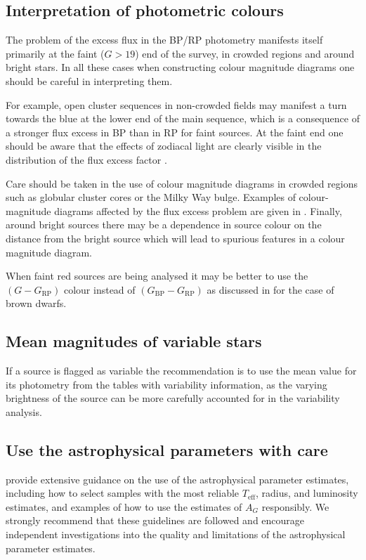 \documentclass[longauth]{aa_gaia} %
\newcommand\gbp{\ensuremath{G_\mathrm{BP}}}
\newcommand\grp{\ensuremath{G_\mathrm{RP}}}
\newcommand\teff{\ensuremath{T_\mathrm{eff}}}
\newcommand\ag{\ensuremath{A_G}}
\begin{document}
\subsection{Interpretation of photometric colours}

The problem of the excess flux in the BP/RP photometry manifests itself primarily at the faint
($G>19$) end of the survey, in crowded regions and around bright stars. In all these cases when
constructing colour magnitude diagrams one should be careful in interpreting them.

For example, open cluster sequences in non-crowded fields may manifest a turn towards the blue at
the lower end of the main sequence, which is a consequence of a stronger flux excess in BP than in
RP for faint sources. At the faint end one should be aware that the effects of zodiacal light are
clearly visible in the distribution of the flux excess factor \citep{DR2-DPACP-40}.

Care should be taken in the use of colour magnitude diagrams in crowded regions such as globular
cluster cores or the Milky Way bulge. Examples of colour-magnitude diagrams affected by the flux
excess problem are given in \cite{DR2-DPACP-39}. Finally, around bright sources there may be a
dependence in source colour on the distance from the bright source which will lead to spurious
features in a colour magnitude diagram.  

When faint red sources are being analysed it may be better to use the $(G-\grp)$ colour instead of
$(\gbp-\grp)$ as discussed in \cite{DR2-DPACP-31} for the case of brown dwarfs.

\subsection{Mean magnitudes of variable stars}

If a source is flagged as variable the recommendation is to use the mean value for its photometry
from the tables with variability information, as the varying brightness of the source can be more
carefully accounted for in the variability analysis.

\subsection{Use the astrophysical parameters with care}

\cite{DR2-DPACP-43} provide extensive guidance on the use of the astrophysical parameter estimates,
including how to select samples with the most reliable {\teff}, radius, and luminosity estimates,
and examples of how to use the estimates of {\ag} responsibly. We strongly recommend that these
guidelines are followed and encourage independent investigations into the quality and limitations of
the astrophysical parameter estimates.
\end{document}
